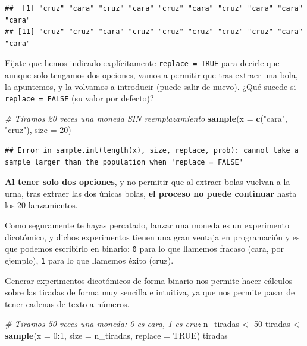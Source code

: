 \documentclass[11pt,]{book}
\newenvironment{Shaded}{\begin{snugshade}}{\end{snugshade}}
\newcommand{\CommentTok}[1]{\textcolor[rgb]{0.37,0.37,0.37}{\textit{#1}}}
\newcommand{\DataTypeTok}[1]{\textcolor[rgb]{0.27,0.27,0.27}{#1}}
\newcommand{\DecValTok}[1]{\textcolor[rgb]{0.06,0.06,0.06}{#1}}
\newcommand{\KeywordTok}[1]{\textcolor[rgb]{0.27,0.27,0.27}{\textbf{#1}}}
\newcommand{\NormalTok}[1]{#1}
\newcommand{\OperatorTok}[1]{\textcolor[rgb]{0.43,0.43,0.43}{\textbf{#1}}}
\newcommand{\OtherTok}[1]{\textcolor[rgb]{0.37,0.37,0.37}{#1}}
\newcommand{\StringTok}[1]{\textcolor[rgb]{0.5,0.5,0.5}{#1}}
\begin{document}
\begin{verbatim}
##  [1] "cruz" "cara" "cruz" "cara" "cruz" "cara" "cruz" "cara" "cara" "cara"
## [11] "cruz" "cruz" "cara" "cruz" "cruz" "cruz" "cruz" "cruz" "cara" "cara"
\end{verbatim}

Fíjate que hemos indicado explícitamente \texttt{replace\ =\ TRUE} para decirle que aunque solo tengamos dos opciones, vamos a permitir que tras extraer una bola, la apuntemos, y la volvamos a introducir (puede salir de nuevo). ¿Qué sucede si \texttt{replace\ =\ FALSE} (su valor por defecto)?

\begin{Shaded}
\begin{Highlighting}[]
\CommentTok{# Tiramos 20 veces una moneda SIN reemplazamiento}
\KeywordTok{sample}\NormalTok{(}\DataTypeTok{x =} \KeywordTok{c}\NormalTok{(}\StringTok{"cara"}\NormalTok{, }\StringTok{"cruz"}\NormalTok{), }\DataTypeTok{size =} \DecValTok{20}\NormalTok{)}
\end{Highlighting}
\end{Shaded}

\begin{verbatim}
## Error in sample.int(length(x), size, replace, prob): cannot take a sample larger than the population when 'replace = FALSE'
\end{verbatim}

\textbf{Al tener solo dos opciones}, y no permitir que al extraer bolas vuelvan a la urna, tras extraer las dos únicas bolas, \textbf{el proceso no puede continuar} hasta los 20 lanzamientos.

Como seguramente te hayas percatado, lanzar una moneda es un experimento dicotómico, y dichos experimentos tienen una gran ventaja en programación y es que podemos escribirlo en binario: \texttt{0} para lo que llamemos fracaso (cara, por ejemplo), \texttt{1} para lo que llamemos éxito (cruz).

Generar experimentos dicotómicos de forma binario nos permite hacer cálculos sobre las tiradas de forma muy sencilla e intuitiva, ya que nos permite pasar de tener cadenas de texto a números.

\begin{Shaded}
\begin{Highlighting}[]
\CommentTok{# Tiramos 50 veces una moneda: 0 es cara, 1 es cruz}
\NormalTok{n_tiradas <-}\StringTok{ }\DecValTok{50}
\NormalTok{tiradas <-}\StringTok{ }\KeywordTok{sample}\NormalTok{(}\DataTypeTok{x =} \DecValTok{0}\OperatorTok{:}\DecValTok{1}\NormalTok{, }\DataTypeTok{size =}\NormalTok{ n_tiradas, }\DataTypeTok{replace =} \OtherTok{TRUE}\NormalTok{)}
\NormalTok{tiradas}
\end{Highlighting}
\end{Shaded}
\end{document}
